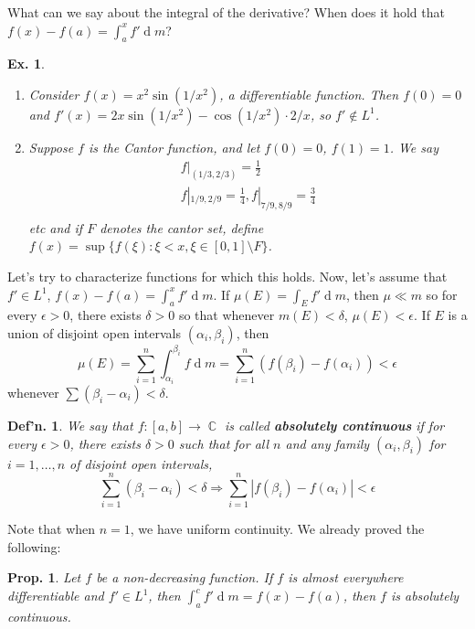 \documentclass[12pt, a4paper]{book}
\DeclareMathOperator{\C}{\mathbb{C}}
\renewcommand{\d}[1]{\ensuremath{\operatorname{d}\!{#1}}} %
\newtheorem{definition}[theorem]{Def'n.}
\newtheorem{proposition}[theorem]{Prop.}
\newtheorem{example}[theorem]{Ex.}
\theoremstyle{nonumberplain}
\begin{document}
What can we say about the integral of the derivative?
When does it hold that $f(x)-f(a)=\int_a^x f'\d{m}$?
\begin{example}
    \begin{enumerate}
        \item Consider $f(x)=x^2\sin(1/x^2)$, a differentiable function.
            Then $f(0)=0$ and $f'(x)=2x\sin(1/x^2)-\cos(1/x^2)\cdot 2/x$, so $f'\notin L^1$.
        \item Suppose $f$ is the Cantor function, and let $f(0)=0$, $f(1)=1$.
            We say
            \begin{align*}
                f|_{(1/3,2/3)}=\frac{1}{2}\\
                f|_{1/9,2/9} = \frac{1}{4},f|_{7/9,8/9}=\frac{3}{4}\\
            \end{align*}
            etc and if $F$ denotes the cantor set, define $f(x)=\sup\{f(\xi):\xi<x,\xi\in[0,1]\setminus F\}$.
    \end{enumerate}
\end{example}
Let's try to characterize functions for which this holds.
Now, let's assume that $f'\in L^1$, $f(x)-f(a)=\int_a^x f'\d{m}$.
If $\mu(E)=\int_E f'\d{m}$, then $\mu\ll m$ so for every $\epsilon>0$, there exists $\delta>0$ so that whenever $m(E)<\delta$, $\mu(E)<\epsilon$.
If $E$ is a union of disjoint open intervals $(\alpha_i,\beta_i)$, then
\[\mu(E)=\sum\limits_{i=1}^n \int_{\alpha_i}^{\beta_i}f\d{m}=\sum\limits_{i=1}^n(f(\beta_i)-f(\alpha_i))<\epsilon\]
whenever $\sum(\beta_i-\alpha_i)<\delta$.
\begin{definition}
    We say that $f:[a,b]\to\C$ is called \textbf{absolutely continuous} if for every $\epsilon>0$, there exists $\delta>0$ such that for all $n$ and any family $(\alpha_i,\beta_i)$ for $i=1,\ldots,n$ of disjoint open intervals,
    \[\sum\limits_{i=1}^n(\beta_i-\alpha_i)<\delta\Longrightarrow\sum\limits_{i=1}^n|f(\beta_i)-f(\alpha_i)|<\epsilon\]
\end{definition}
Note that when $n=1$, we have uniform continuity.
We already proved the following:
\begin{proposition}
    Let $f$ be a non-decreasing function.
    If $f$ is almost everywhere differentiable and $f'\in L^1$, then $\int_a^c f'\d{m}=f(x)-f(a)$, then $f$ is absolutely continuous.
\end{proposition}
\end{document}
